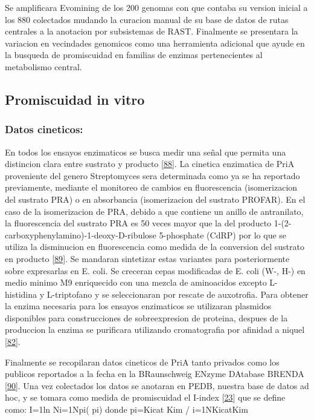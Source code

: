 \documentclass[12pt,twoside]{reedthesis}
\begin{document}
  Se amplificara Evomining de los 200 genomas con que contaba su version
  inicial a los 880 colectados mudando la curacion manual de su base de
  datos de rutas centrales a la anotacion por subsistemas de RAST.
  Finalmente se presentara la variacion en vecindades genomicos como una
  herramienta adicional que ayude en la busqueda de promiscuidad en
  familias de enzimas pertenecientes al metabolismo central.
  
  \subsection{Promiscuidad in vitro}\label{promiscuidad-in-vitro}
  
  \subsubsection{Datos cineticos:}\label{datos-cineticos}
  
  En todos los ensayos enzimaticos se busca medir una señal que permita
  una distincion clara entre sustrato y producto
  {[}\protect\hyperlink{ref-bisswanger_general_2011}{88}{]}. La cinetica
  enzimatica de PriA proveniente del genero Streptomyces sera determinada
  como ya se ha reportado previamente, mediante el monitoreo de cambios en
  fluorescencia (isomerizacion del sustrato PRA) o en absorbancia
  (isomerizacion del sustrato PROFAR). En el caso de la isomerizacion de
  PRA, debido a que contiene un anillo de antranilato, la fluorescencia
  del sustrato PRA es 50 veces mayor que la del producto
  1-(2-carboxyphenylamino)-1-deoxy-D-ribulose 5-phosphate (CdRP) por lo
  que se utiliza la disminucion en fluorescencia como medida de la
  conversion del sustrato en producto
  {[}\protect\hyperlink{ref-hommel_phosphoribosyl_1995}{89}{]}. Se
  mandaran sintetizar estas variantes para posteriormente sobre
  expresarlas en E. coli. Se creceran cepas modificadas de E. coli (W-,
  H-) en medio minimo M9 enriquecido con una mezcla de aminoacidos excepto
  L-histidina y L-triptofano y se seleccionaran por rescate de auxotrofia.
  Para obtener la enzima necesaria para los ensayos enzimaticos se
  utilizaran plasmidos disponibles para construcciones de sobreexpresion
  de proteina, despues de la produccion la enzima se purificara utilizando
  cromatografia por afinidad a niquel
  {[}\protect\hyperlink{ref-verduzco-castro_co-occurrence_2016}{82}{]}.
  
  Finalmente se recopilaran datos cineticos de PriA tanto privados como
  los publicos reportados a la fecha en la BRaunschweig ENzyme DAtabase
  BRENDA {[}\protect\hyperlink{ref-scheer_brenda_2011}{90}{]}. Una vez
  colectados los datos se anotaran en PEDB, nuestra base de datos ad hoc,
  y se tomara como medida de promiscuidad el I-index
  {[}\protect\hyperlink{ref-nath_quantitative_2008}{23}{]} que se define
  como: I=1ln Ni=1Npi( pi) donde pi=Kicat Kim / i=1NKicatKim
  
\end{document}

